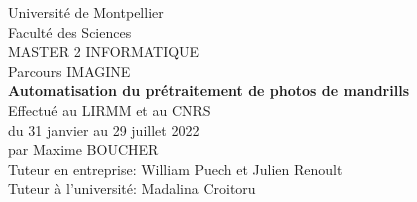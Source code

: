 \begin{titlepage}
\begin{center}
\vspace{\interline}
\Large{Université de Montpellier\\
\vspace{\interline}
Faculté des Sciences} \\
\vspace{2cm}
{\huge MASTER 2 INFORMATIQUE \\
\vspace{\interline}
Parcours IMAGINE \\}
\vspace{2cm}
{\huge \textbf{Automatisation du prétraitement de photos de mandrills}}\\
\vspace{2cm}
Effectué au LIRMM et au CNRS \\
\vspace{\interline}
du 31 janvier au 29 juillet 2022 \\
\vspace{\interline}
par Maxime BOUCHER\\
\vspace{2cm}
Tuteur en entreprise: William Puech et Julien Renoult \\
\vspace{\interline}
Tuteur à l'université: Madalina Croitoru 
    
\end{center}
\end{titlepage}
